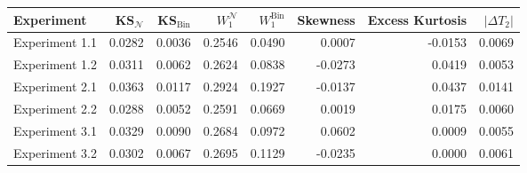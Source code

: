 \begin{tabular}{lrrrrrrr}
\hline
Experiment & KS$_{\mathcal N}$ & KS$_{\mathrm{Bin}}$ & $W_1^{\mathcal N}$ & $W_1^{\mathrm{Bin}}$ & Skewness & Excess Kurtosis & $|\Delta T_2|$ \\
\hline
Experiment 1.1 & 0.0282 & 0.0036 & 0.2546 & 0.0490 & 0.0007 & -0.0153 & 0.0069 \\
Experiment 1.2 & 0.0311 & 0.0062 & 0.2624 & 0.0838 & -0.0273 & 0.0419 & 0.0053 \\
Experiment 2.1 & 0.0363 & 0.0117 & 0.2924 & 0.1927 & -0.0137 & 0.0437 & 0.0141 \\
Experiment 2.2 & 0.0288 & 0.0052 & 0.2591 & 0.0669 & 0.0019 & 0.0175 & 0.0060 \\
Experiment 3.1 & 0.0329 & 0.0090 & 0.2684 & 0.0972 & 0.0602 & 0.0009 & 0.0055 \\
Experiment 3.2 & 0.0302 & 0.0067 & 0.2695 & 0.1129 & -0.0235 & 0.0000 & 0.0061 \\
\hline
\end{tabular}
